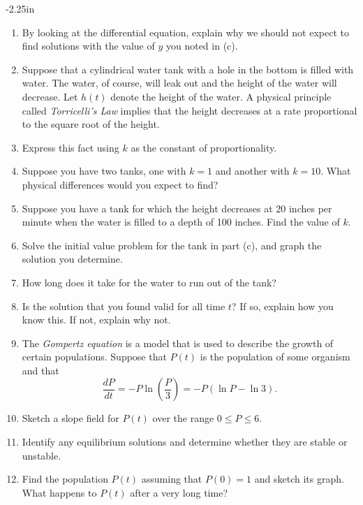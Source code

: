 \begin{adjustwidth*}{}{-2.25in}
\begin{multicols*}{2}
\begin{enumerate}[1)]
    \item By looking at the differential equation, explain why we
      should not expect to find solutions with the value of $y$ you noted in (c).

      \ea

  \item  Suppose that a cylindrical water tank with a hole in the
    bottom is filled with water.  The water, of course, will leak out
    and the height of the water will decrease.  Let $h(t)$ denote the
    height of the water.  A physical principle called {\em Torricelli's
      Law} implies that the height decreases at a rate proportional to
    the square root of the height.

    \ba
    \item Express this fact using $k$ as the constant of
      proportionality.  
    \item Suppose you have two tanks, one with $k=1$ and another with
      $k=10$.  What physical differences would you expect to find?
    \item Suppose you have a tank for which the height decreases at 20
      inches per minute when the water is filled to a depth of 100
      inches.  Find the value of $k$.  
    \item Solve the initial value problem for the tank in part (c), and graph the solution you determine.
    \item How long does it take for the water to run out of the tank?
    \item Is the solution that you found valid for all time $t$?  If
      so, explain how you know this.  If not, explain why not.
    \ea

  \item The {\em Gompertz equation} is a model that is used to
    describe the growth of certain populations.  Suppose that $P(t)$
    is the population of some organism and that
    $$
    \frac{dP}{dt} = -P\ln\left(\frac P3\right) = -P(\ln P - \ln 3).
    $$

    \ba
    \item Sketch a slope field for $P(t)$ over the range $0\leq P\leq
      6$.

    \item Identify any equilibrium solutions and determine whether
      they are stable or unstable.

    \item Find the population $P(t)$ assuming that $P(0) = 1$ and sketch
      its graph.  What happens to $P(t)$ after a very long time?


\end{enumerate}
\end{multicols*}
\end{adjustwidth*}
